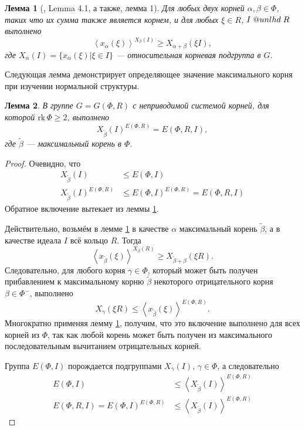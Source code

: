 \documentclass[12pt]{matmex-diploma}
\makeatletter
\newcommand{\slunlhd}{%
  \mathrel{\mathpalette\sl@unlhd\relax}%
}
\newcommand{\sl@unlhd}[2]{%
  \sbox\z@{$#1\lhd$}%
  \sbox\tw@{$#1\leqslant$}%
  \dimen@=\ht\tw@
  \advance\dimen@-\ht\z@
  \ifx#1\displaystyle
    \advance\dimen@ .2pt
  \else
    \ifx#1\textstyle
      \advance\dimen@ .2pt
    \fi
  \fi
  \ooalign{\raisebox{\dimen@}{$\m@th#1\lhd$}\cr$\m@th#1\leqslant$\cr}%
}
\theoremstyle{mystyleni}
\theoremstyle{mystyle}
\newtheorem{lm}{Лемма}
\newcommand\refb[1]{\ref{#1}}
\renewcommand{\le}{\leqslant}
\renewcommand{\ge}{\geqslant}
\renewcommand{\trianglelefteq}{\slunlhd}
\makeatother
\begin{document}
\begin{lm}[\citep{Stavrova2009}, Lemma 4.1, а также\cite{Vavilov1978}, лемма 1]
  \label{transitivity}
  Для любых двух корней $\alpha, \beta \in \Phi$, таких что их сумма также является корнем, и для любых  $\xi \in R$, $I \trianglelefteq R$ выполнено
  $$ \left< x_\alpha(\xi) \right>^{X_\beta(I)} \ge X_{\alpha + \beta}(\xi I), $$  
  где $X_\alpha(I) = \{x_\alpha(\xi) | \xi \in I\}$ --- относительная корневая подгруппа в $G$.
\end{lm}

Следующая лемма демонстрирует определяющее значение максимального корня при изучении нормальной структуры.

\begin{lm} \label{maximalgenerates}
  В группе $G=G(\Phi,R)$ с неприводимой системой корней, для которой $\mathrm{rk}\,\Phi \ge 2$, выполнено
  $$X_{\widetilde\beta}(I)^{E(\Phi,R)} = E(\Phi,R,I),$$
  где $\widetilde\beta$ --- максимальный корень в $\Phi$.
\end{lm}
\begin{proof}
  Очевидно, что
\begin{align*}
  X_{\widetilde\beta}(I) &\le E(\Phi,I) \\
  X_{\widetilde\beta}(I)^{E(\Phi,R)} &\le E(\Phi,I)^{E(\Phi,R)} = E(\Phi,R,I)
\end{align*}
  Обратное включение вытекает из леммы \refb{transitivity}.

  Действительно, возьмём в лемме \refb{transitivity} в качестве $\alpha$ максимальный корень $\widetilde{\beta}$, а в качестве идеала $I$ всё кольцо $R$. Тогда
  $$ \left< x_{\widetilde\beta}(\xi) \right>^{X_\beta(R)} \ge X_{\widetilde\beta + \beta}(\xi R). $$
  Следовательно, для любого корня $\gamma \in \Phi$, который может быть получен прибавлением к максимальному корню $\widetilde\beta$ некоторого отрицательного корня $\beta \in \Phi^-$, выполнено
  $$ X_\gamma(\xi R) \le \left< x_{\widetilde\beta}(\xi)\right>^{E(\Phi,R)} .$$
  Многократно применяя лемму \refb{transitivity}, получим, что это включение выполнено для всех корней из $\Phi$, так как любой корень может быть получен из максимального последовательным вычитанием отрицательных корней.
  
  Группа $E(\Phi,I)$ порождается подгруппами $X_\gamma(I)$, $\gamma \in \Phi$, а следовательно 
\begin{align*}
E(\Phi,I) &\le \left< X_{\widetilde\beta}(I) \right>^{E(\Phi,R)}\\
  E(\Phi,R,I) = E(\Phi,I)^{E(\Phi,R)} &\le \left< X_{\widetilde\beta}(I) \right>^{E(\Phi,R)}
\end{align*}
\end{proof}
\end{document}
